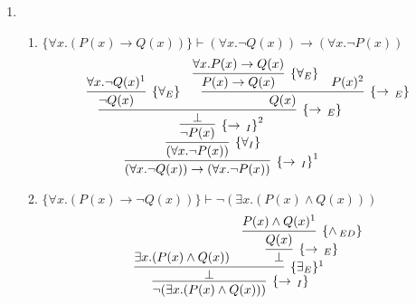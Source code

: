 	\begin{enumerate}
		\item 
		\begin{enumerate}
			\item $\{\forall x. (P(x)\rightarrow Q(x))\}\vdash(\forall x.\neg Q(x))\rightarrow(\forall x.\neg P(x))$
	           \[
	           \infer[\impI^1]
	                   {(\forall x.\neg Q(x))\to(\forall x.\neg P(x))}
	                   {
	                   \infer[\{\forall_I\}]
	                       {(\forall x.\neg P(x))}
	                       {
	                         \infer[\impI^2]
                               {\neg P(x)}
                               {
                                 \infer[\impE]
                                          {\bot}
                                          {
                                            \infer[\{\forall_E\}]
                                                 {\neg Q(x)}                                                      
                                                 {\forall x. \neg Q(x)^1}
                                             &
                                             \infer[\impE]
                                                 {Q(x)}
                                                  {                                     
                                                    \infer[\{\forall_E\}]
                                                          {P(x) \to Q(x)}
                                                          {\forall x. P(x) \to Q(x)}
                                                    &
                                                    P(x)^2
                                                  }
                                          }
                               }
	                       }
	                }
	           \]
			\item $\{\forall x. (P(x)\rightarrow \neg Q(x))\}\vdash\neg (\exists x. (P(x)\land Q(x)))$
	            \[
	            \infer[\impI]
	                 {\neg (\exists x. (P(x)\land Q(x)))}
	                 {
	                   \infer[\{\exists_E\}^1]
	                            {\bot}
	                            {
	                              \exists x.(P(x)\land Q(x))
	                              &
	                              \infer[\impE]
	                                    {\bot}
	                                    {
	                                      \infer[\andED]
	                                              {Q(x)}
	                                              {P(x) \land Q(x)^1}
}}}\]
\end{enumerate}
\end{enumerate}

